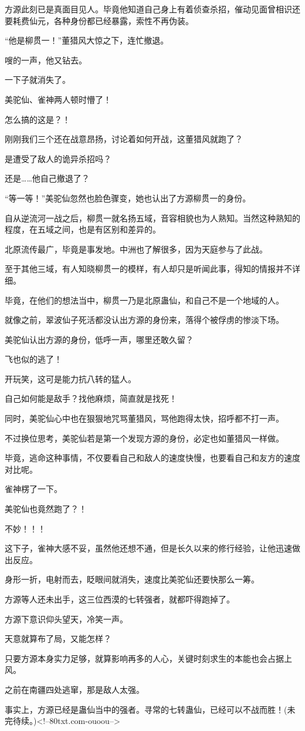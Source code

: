 \begin{this_body}
方源此刻已是真面目见人。毕竟他知道自己身上有着侦查杀招，催动见面曾相识还要耗费仙元，各种身份都已经暴露，索性不再伪装。

“他是柳贯一！”董猎风大惊之下，连忙撤退。

嗖的一声，他又钻去。

一下子就消失了。

美驼仙、雀神两人顿时懵了！

怎么搞的这是？！

刚刚我们三个还在战意昂扬，讨论着如何开战，这董猎风就跑了？

是遭受了敌人的诡异杀招吗？

还是……他自己撤退了？

“等一等！”美驼仙忽然也脸色骤变，她也认出了方源柳贯一的身份。

自从逆流河一战之后，柳贯一就名扬五域，音容相貌也为人熟知。当然这种熟知的程度，在五域之间，也是有区别和差异的。

北原流传最广，毕竟是事发地。中洲也了解很多，因为天庭参与了此战。

至于其他三域，有人知晓柳贯一的模样，有人却只是听闻此事，得知的情报并不详细。

毕竟，在他们的想法当中，柳贯一乃是北原蛊仙，和自己不是一个地域的人。

就像之前，翠波仙子死活都没认出方源的身份来，落得个被俘虏的惨淡下场。

美驼仙认出方源的身份，低呼一声，哪里还敢久留？

飞也似的逃了！

开玩笑，这可是能力抗八转的猛人。

自己如何能是敌手？找他麻烦，简直就是找死！

同时，美驼仙心中也在狠狠地咒骂董猎风，骂他跑得太快，招呼都不打一声。

不过换位思考，美驼仙若是第一个发现方源的身份，必定也如董猎风一样做。

毕竟，逃命这种事情，不仅要看自己和敌人的速度快慢，也要看自己和友方的速度对比呢。

雀神楞了一下。

美驼仙也竟然跑了？！

不妙！！！

这下子，雀神大感不妥，虽然他还想不通，但是长久以来的修行经验，让他迅速做出反应。

身形一折，电射而去，眨眼间就消失，速度比美驼仙还要快那么一筹。

方源等人还未出手，这三位西漠的七转强者，就都吓得跑掉了。

方源下意识仰头望天，冷笑一声。

天意就算布了局，又能怎样？

只要方源本身实力足够，就算影响再多的人心，关键时刻求生的本能也会占据上风。

之前在南疆四处逃窜，那是敌人太强。

事实上，方源已经是蛊仙当中的强者。寻常的七转蛊仙，已经可以不战而胜！(未完待续。)<!--80txt.com-ouoou-->

\end{this_body}

